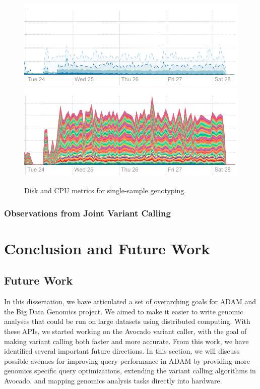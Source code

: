 \documentclass[phd]{ucbthesis}
\begin{document}
\begin{figure}[h]
  \begin{center}
    \includegraphics[width=0.95\linewidth]{graphs/phase2-disk.png}
    \includegraphics[width=0.95\linewidth]{graphs/phase2-cpu.png}
  \end{center}
  \caption{Disk and CPU metrics for single-sample genotyping.}
  \label{fig:phase2}
\end{figure}


\section{Observations from Joint Variant Calling}
\label{sec:joint-calling}

\part{Conclusion and Future Work}

\chapter{Future Work}
\label{chap:future-work}

In this dissertation, we have articulated a set of overarching goals for
{ADAM} and the {Big Data Genomics} project. We aimed to make it
easier to write genomic analyses that could be run on large datasets using
distributed computing. With these APIs, we started working on the
{Avocado} variant caller, with the goal of making variant calling both
faster and more accurate. From this work, we have identified several important
future directions. In this section, we will discuss possible avenues for
improving query performance in {ADAM} by providing more genomics specific
query optimizations, extending the variant calling algorithms in
{Avocado}, and mapping genomics analysis tasks directly into hardware.
\end{document}
